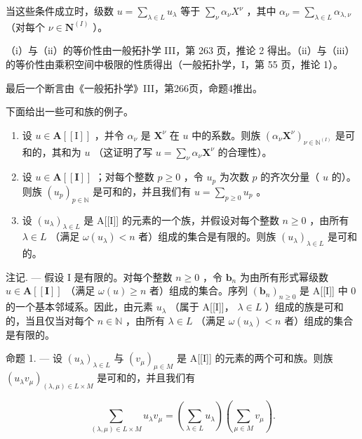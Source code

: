 当这些条件成立时，级数 \(u = \sum_{\lambda \in L} u_{\lambda}\) 等于 \(\sum_{\nu} \alpha_{\nu} X^{\nu}\) ，其中 \(\alpha_{\nu} = \sum_{\lambda \in L} \alpha_{\lambda, \nu}\) （对每个 \(\nu \in \mathbf{N}^{(I)}\) ）。

（i）与（ii）的等价性由一般拓扑学 III，第 263 页，推论 2 得出。（ii）与（iii）的等价性由乘积空间中极限的性质得出（一般拓扑学，I，第 55 页，推论 1）。

最后一个断言由《一般拓扑学》III，第266页，命题4推出。

下面给出一些可和族的例子。

\begin{enumerate}
\def\labelenumi{\alph{enumi})}
\item
  设 \(u \in \mathbf{A}[[\mathrm{I}]]\) ，并令 \(\alpha_{\nu}\) 是 \(\mathbf{X}^{\nu}\) 在 \(u\) 中的系数。则族 \((\alpha_{\nu}\mathbf{X}^{\nu})_{\nu \in \mathbb{N}^{(I)}}\) 是可和的，其和为 \(u\) （这证明了写 \(u = \sum_{\nu} \alpha_{\nu}\mathbf{X}^{\nu}\) 的合理性）。
\item
  设 \(u \in \mathbf{A}[[\mathbf{I}]]\) ；对每个整数 \(p \geqslant 0\) ，令 \(u_p\) 为次数 \(p\) 的齐次分量（ \(u\) 的）。则族 \((u_p)_{p \in \mathbb{N}}\) 是可和的，并且我们有 \(u = \sum_{p \geqslant 0} u_p\) 。
\item
  设 \((u_{\lambda})_{\lambda \in L}\) 是 A{[}{[}I{]}{]} 的元素的一个族，并假设对每个整数 \(n \geqslant 0\) ，由所有 \(\lambda \in L\) （满足 \(\omega(u_{\lambda}) < n\) 者）组成的集合是有限的。则族 \((u_{\lambda})_{\lambda \in L}\) 是可和的。
\end{enumerate}

注记. --- 假设 I 是有限的。对每个整数 \(n \geqslant 0\) ，令 \(\mathbf{b}_n\) 为由所有形式幂级数 \(u \in \mathbf{A}[[\mathbf{I}]]\) （满足 \(\omega(u) \geqslant n\) 者）组成的集合。序列 \((\mathbf{b}_n)_{n \geqslant 0}\) 是 A{[}{[}I{]}{]} 中 0 的一个基本邻域系。因此，由元素 \(u_{\lambda}\) （属于 A{[}{[}I{]}{]}， \(\lambda \in L\) ）组成的族是可和的，当且仅当对每个 \(n \in \mathbb{N}\) ，由所有 \(\lambda \in L\) （满足 \(\omega(u_{\lambda}) < n\) 者）组成的集合是有限的。

命题 1. --- 设 \((u_{\lambda})_{\lambda \in L}\) 与 \((v_{\mu})_{\mu \in M}\) 是 A{[}{[}I{]}{]} 的元素的两个可和族。则族 \((u_{\lambda}v_{\mu})_{(\lambda, \mu) \in L \times M}\) 是可和的，并且我们有

\[
\sum_ {(\lambda , \mu) \in L \times M} u _ {\lambda} v _ {\mu} = \left(\sum_ {\lambda \in L} u _ {\lambda}\right) \left(\sum_ {\mu \in M} v _ {\mu}\right).\tag{2}
\]

